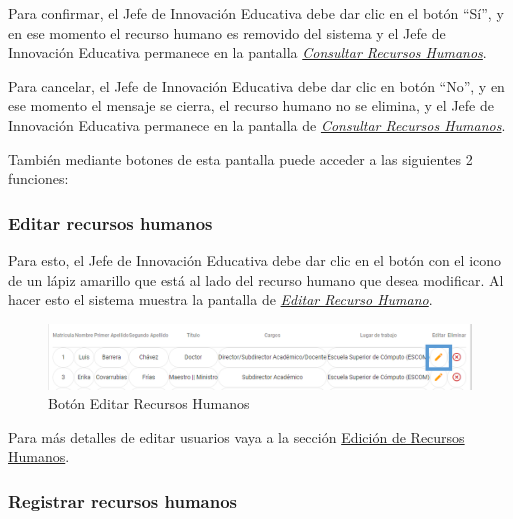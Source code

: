 \begin{enumerate}
\begin{figure}[H]
                \end{figure}

                Para confirmar, el Jefe de Innovación Educativa debe dar clic en el botón “Sí”, y en ese momento el recurso humano es removido del sistema y el Jefe de Innovación Educativa permanece en la pantalla \hyperlink{consultarRH}{\textit{Consultar Recursos Humanos}}.


                Para cancelar, el Jefe de Innovación Educativa debe dar clic en botón “No”, y en ese momento el mensaje se cierra, el recurso humano no se elimina, y el Jefe de Innovación Educativa permanece en la pantalla de \hyperlink{consultarRH}{\textit{Consultar Recursos Humanos}}.



        \end{enumerate}

        También mediante botones de esta pantalla puede acceder a las siguientes 2 funciones:

        \subsubsection{Editar recursos humanos}

            Para esto, el Jefe de Innovación Educativa debe dar clic en el botón con el icono de un lápiz amarillo que está al lado del recurso humano que desea modificar. Al hacer esto el sistema muestra la pantalla   de \hyperlink{editarRH}{\textit{Editar Recurso Humano}}.

            \begin{figure}[H]
                \centering
                \hypertarget{editarRH}{\includegraphics[width=0.7\linewidth]{images/SP1/BtnEditar}}
                \caption{Botón Editar Recursos Humanos}
                \label{editar}
            \end{figure}

            Para más detalles de editar usuarios vaya a la sección \hyperlink{editar-RH}{Edición de Recursos Humanos}.

        \subsubsection{Registrar recursos humanos}

